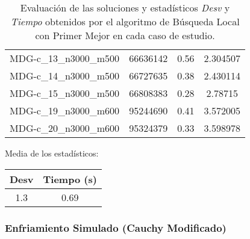\documentclass{article}
\begin{document}
\begin{table}[H]
\begin{tabular}{|cccc|}
		MDG-c\_13\_n3000\_m500 & 66636142 & 0.56 & 2.304507\\
		MDG-c\_14\_n3000\_m500 & 66727635 & 0.38 & 2.430114\\
		MDG-c\_15\_n3000\_m500 & 66808383 & 0.28 & 2.78715\\
		MDG-c\_19\_n3000\_m600 & 95244690 & 0.41 & 3.572005\\
		MDG-c\_20\_n3000\_m600 & 95324379 & 0.33 & 3.598978\\
		\hline
	\end{tabular}
	\caption{Evaluación de las soluciones y estadísticos \emph{Desv} y \emph{Tiempo} obtenidos por el algoritmo de Búsqueda Local
		con Primer Mejor en cada caso de estudio.}
	\label{tab:bs-primer-mejor}
\end{table}

Media de los estadísticos:
\begin{table}[H]
	\centering
	\begin{tabular}{|cc|}
		\hline
		Desv & Tiempo (s)\\ \hline
		1.3 & 0.69 \\
		\hline
	\end{tabular}
\end{table}

\pagebreak

\subsubsection*{Enfriamiento Simulado (Cauchy Modificado)}
\end{document}
